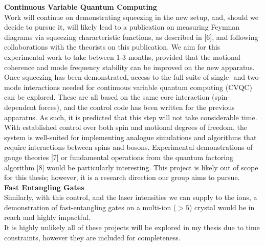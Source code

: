 \documentclass[12pt]{article}
\begin{document}
\noindent \textbf{Continuous Variable Quantum Computing}\\

\noindent Work will continue on demonstrating squeezing in the new setup, and, should we decide to pursue it, will likely lead to a publication on measuring Feynman diagrams via squeezing characteristic functions, as described in [6], and following collaborations with the theorists on this publication. We aim for this experimental work to take between 1-3 months, provided that the motional coherence and mode frequency stability can be improved on the new apparatus.\\
\noindent Once squeezing has been demonstrated, access to the full suite of single- and two-mode interactions needed for continuous variable quantum computing (CVQC) can be explored. These are all based on the same core interaction (spin-dependent forces), and the control code has been written for the previous apparatus. As such, it is predicted that this step will not take considerable time.\\
\noindent With established control over both spin and motional degrees of freedom, the system is well-suited for implementing analogue simulations and algorithms that require interactions between spins and bosons. Experimental demonstrations of gauge theories [7] or fundamental operations from the quantum factoring algorithm [8] would be particularly interesting. This project is likely out of scope for this thesis; however, it is a research direction our group aims to pursue. \\

\noindent \textbf{Fast Entangling Gates}\\

\noindent Similarly, with this control, and the laser intensities we can supply to the ions, a demonstration of fast-entangling gates on a multi-ion ($>5$) crystal would be in reach and highly impactful. \\
It is highly unlikely all of these projects will be explored in my thesis due to time constraints, however they are included for completeness.\\
\end{document}

